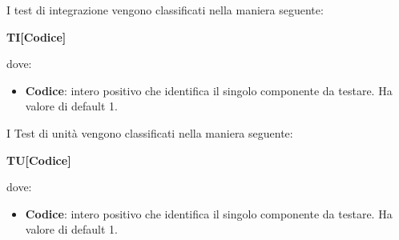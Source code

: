             I test di integrazione vengono classificati nella maniera seguente:
            \begin{center}
                \textbf{TI[Codice]}
            \end{center}
            dove:\\
            \begin{itemize}
                \item \textbf{Codice}: intero positivo che identifica il singolo componente da testare. Ha valore di default 1.
            \end{itemize}

            I Test di unità vengono classificati nella maniera seguente:
            \begin{center}
                \textbf{TU[Codice]}
            \end{center}
            dove:\\
            \begin{itemize}
                \item \textbf{Codice}: intero positivo che identifica il singolo componente da testare. Ha valore di default 1.
            \end{itemize}

